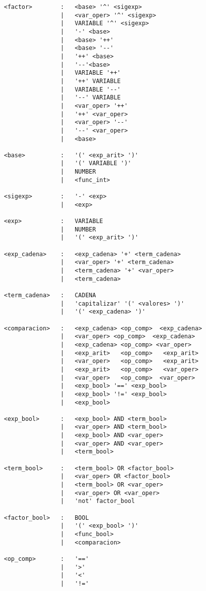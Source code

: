 \begin{verbatim}
<factor>        :   <base> '^' <sigexp>
                |   <var_oper> '^' <sigexp>
                |   VARIABLE '^' <sigexp>
                |   '-' <base>  
                |   <base> '++'
                |   <base> '--'
                |   '++' <base>
                |   '--'<base>
                |   VARIABLE '++'
                |   '++' VARIABLE
                |   VARIABLE '--'
                |   '--' VARIABLE
                |   <var_oper> '++'
                |   '++' <var_oper>
                |   <var_oper> '--'
                |   '--' <var_oper>
                |   <base>

<base>          :   '(' <exp_arit> ')'
                |   '(' VARIABLE ')'
                |   NUMBER
                |   <func_int>

<sigexp>        :   '-' <exp>
                |   <exp>

<exp>           :   VARIABLE
                |   NUMBER
                |   '(' <exp_arit> ')'

<exp_cadena>    :   <exp_cadena> '+' <term_cadena>
                |   <var_oper> '+' <term_cadena>
                |   <term_cadena> '+' <var_oper> 
                |   <term_cadena> 

<term_cadena>   :   CADENA
                |   'capitalizar' '(' <valores> ')'
                |   '(' <exp_cadena> ')'

<comparacion>   :   <exp_cadena> <op_comp>  <exp_cadena>
                |   <var_oper> <op_comp>  <exp_cadena>
                |   <exp_cadena> <op_comp> <var_oper> 
                |   <exp_arit>   <op_comp>   <exp_arit>
                |   <var_oper>   <op_comp>   <exp_arit>
                |   <exp_arit>   <op_comp>   <var_oper>
                |   <var_oper>   <op_comp>  <var_oper> 
                |   <exp_bool> '==' <exp_bool>
                |   <exp_bool> '!=' <exp_bool>
                |   <exp_bool>

<exp_bool>      :   <exp_bool> AND <term_bool>
                |   <var_oper> AND <term_bool>
                |   <exp_bool> AND <var_oper>
                |   <var_oper> AND <var_oper>
                |   <term_bool>

<term_bool>     :   <term_bool> OR <factor_bool>
                |   <var_oper> OR <factor_bool>
                |   <term_bool> OR <var_oper>
                |   <var_oper> OR <var_oper>
                |   'not' factor_bool

<factor_bool>   :   BOOL
                |   '(' <exp_bool> ')'
                |   <func_bool>
                |   <comparacion>

<op_comp>       :   '=='
                |   '>'
                |   '<'
                |   '!='


    
\end{verbatim}
